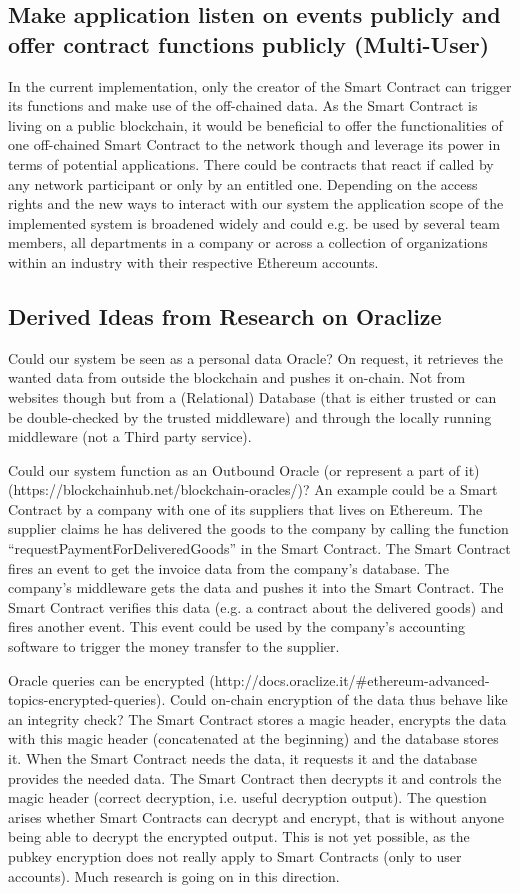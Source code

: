 \subsection{Make application listen on events publicly and offer contract functions publicly (Multi-User)}
In the current implementation, only the creator of the Smart Contract can trigger its functions and make use of the off-chained data. As the Smart Contract is living on a public blockchain, it would be beneficial to offer the functionalities of one off-chained Smart Contract to the network though and leverage its power in terms of potential applications. There could be contracts that react if called by any network participant or only by an entitled one. Depending on the access rights and the new ways to interact with our system the application scope of the implemented system is broadened widely and could e.g. be used by several team members, all departments in a company or across a collection of organizations within an industry with their respective Ethereum accounts.

\subsection{Derived Ideas from Research on Oraclize}
Could our system be seen as a personal data Oracle? On request, it retrieves the wanted data from outside the blockchain and pushes it on-chain. Not from websites though but from a (Relational) Database (that is either trusted or can be double-checked by the trusted middleware) and through the locally running middleware (not a Third party service).

Could our system function as an Outbound Oracle (or represent a part of it) (https://blockchainhub.net/blockchain-oracles/)?
An example could be a Smart Contract by a company with one of its suppliers that lives on Ethereum. The supplier claims he has delivered the goods to the company by calling the function “requestPaymentForDeliveredGoods” in the Smart Contract. The Smart Contract fires an event to get the invoice data from the company’s database. The company’s middleware gets the data and pushes it into the Smart Contract. The Smart Contract verifies this data (e.g. a contract about the delivered goods) and fires another event. This event could be used by the company’s accounting software to trigger the money transfer to the supplier.

Oracle queries can be encrypted (http://docs.oraclize.it/\#ethereum-advanced-topics-encrypted-queries). Could on-chain encryption of the data thus behave like an integrity check? The Smart Contract stores a magic header, encrypts the data with this magic header (concatenated at the beginning) and the database stores it.
When the Smart Contract needs the data, it requests it and the database provides the needed data. The Smart Contract then decrypts it and controls the magic header (correct decryption, i.e. useful decryption output).
The question arises whether Smart Contracts can decrypt and encrypt, that is without anyone being able to decrypt the encrypted output. This is not yet possible, as the pubkey encryption does not really apply to Smart Contracts (only to user accounts). Much research is going on in this direction.

